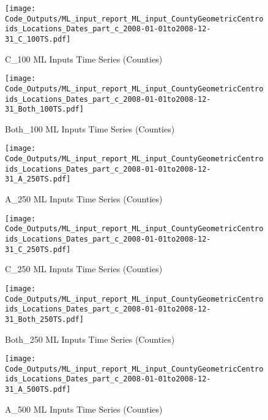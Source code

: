 \begin{figure} 
\centering  
\texttt{[image: Code\_Outputs/ML\_input\_report\_ML\_input\_CountyGeometricCentroids\_Locations\_Dates\_part\_c\_2008-01-01to2008-12-31\_C\_100TS.pdf]} 
\caption{\label{fig:ML_input_report_ML_input_CountyGeometricCentroids_Locations_Dates_part_c_2008-01-01to2008-12-31C_100TS}C_100 ML Inputs Time Series (Counties)} 
\end{figure} 
 

\begin{figure} 
\centering  
\texttt{[image: Code\_Outputs/ML\_input\_report\_ML\_input\_CountyGeometricCentroids\_Locations\_Dates\_part\_c\_2008-01-01to2008-12-31\_Both\_100TS.pdf]} 
\caption{\label{fig:ML_input_report_ML_input_CountyGeometricCentroids_Locations_Dates_part_c_2008-01-01to2008-12-31Both_100TS}Both_100 ML Inputs Time Series (Counties)} 
\end{figure} 
 

\begin{figure} 
\centering  
\texttt{[image: Code\_Outputs/ML\_input\_report\_ML\_input\_CountyGeometricCentroids\_Locations\_Dates\_part\_c\_2008-01-01to2008-12-31\_A\_250TS.pdf]} 
\caption{\label{fig:ML_input_report_ML_input_CountyGeometricCentroids_Locations_Dates_part_c_2008-01-01to2008-12-31A_250TS}A_250 ML Inputs Time Series (Counties)} 
\end{figure} 
 

\begin{figure} 
\centering  
\texttt{[image: Code\_Outputs/ML\_input\_report\_ML\_input\_CountyGeometricCentroids\_Locations\_Dates\_part\_c\_2008-01-01to2008-12-31\_C\_250TS.pdf]} 
\caption{\label{fig:ML_input_report_ML_input_CountyGeometricCentroids_Locations_Dates_part_c_2008-01-01to2008-12-31C_250TS}C_250 ML Inputs Time Series (Counties)} 
\end{figure} 
 

\begin{figure} 
\centering  
\texttt{[image: Code\_Outputs/ML\_input\_report\_ML\_input\_CountyGeometricCentroids\_Locations\_Dates\_part\_c\_2008-01-01to2008-12-31\_Both\_250TS.pdf]} 
\caption{\label{fig:ML_input_report_ML_input_CountyGeometricCentroids_Locations_Dates_part_c_2008-01-01to2008-12-31Both_250TS}Both_250 ML Inputs Time Series (Counties)} 
\end{figure} 
 

\begin{figure} 
\centering  
\texttt{[image: Code\_Outputs/ML\_input\_report\_ML\_input\_CountyGeometricCentroids\_Locations\_Dates\_part\_c\_2008-01-01to2008-12-31\_A\_500TS.pdf]} 
\caption{\label{fig:ML_input_report_ML_input_CountyGeometricCentroids_Locations_Dates_part_c_2008-01-01to2008-12-31A_500TS}A_500 ML Inputs Time Series (Counties)} 
\end{figure} 
 

